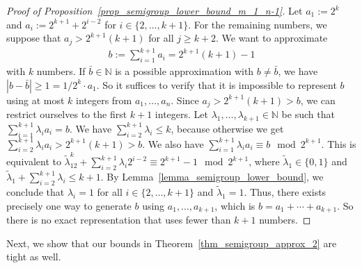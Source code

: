 \documentclass[pdflatex]{sn-jnl}
\newcommand{\N}{\mathbb{N}}
\theoremstyle{thmstyleone}%
\theoremstyle{thmstyletwo}%
\theoremstyle{thmstylethree}%
\begin{document}
	\begin{proof}[Proof of Proposition~\ref{prop_semigroup_lower_bound_m_1_n-1}]
		Let $a_1 := 2^{k}$ and $a_i := 2^{k+1} + 2^{i-2}$ for $i\in\lbrace 2,\ldots,k+1\rbrace$. For the remaining numbers, we suppose that $a_j > 2^{k+1}(k+1)$ for all $j\geq k+2$. We want to approximate 
		\begin{align*}
			b := \sum_{i=1}^{k+1}a_i = 2^{k+1}(k+1) -1
		\end{align*} 
		with $k$ numbers. 
		If $\bar{b}\in \N$ is a possible approximation with $b\neq\bar{b}$, we have $\left| b - \bar{b}\right| \geq 1 = 1/2^{k}\cdot a_1$. So it suffices to verify that it is impossible to represent $b$ using at most $k$ integers from $a_1,\ldots,a_n$. Since $a_j > 2^{k+1}(k+1) > b$, we can restrict ourselves to the first $k+1$ integers. 
		Let $\lambda_1,\ldots,\lambda_{k+1}\in \N$ be such that $\sum_{i=1}^{k+1}\lambda_i a_i = b$. We have $\sum_{i=2}^{k+1}\lambda_i \leq k$, because otherwise we get $\sum_{i=2}^{k+1}\lambda_i a_i > 2^{k+1}(k+1) > b$. We also have $\sum_{i=1}^{k+1}\lambda_i a_i \equiv b \mod 2^{k+1}$. This is equivalent to $\tilde{\lambda}_12^{k} + \sum_{i=2}^{k+1}\lambda_i 2^{i-2} \equiv 2^{k+1} - 1 \mod 2^{k+1}$, where $\tilde{\lambda}_1\in\lbrace 0,1\rbrace$ and $\tilde{\lambda}_1 + \sum_{i=2}^{k+1}\lambda_i\leq {k+1}$. By Lemma~\ref{lemma_semigroup_lower_bound}, we conclude that $\lambda_i = 1$ for all $i\in\lbrace 2,\ldots,k+1\rbrace$ and $\tilde{\lambda}_1 = 1$. Thus, there exists precisely one way to generate $b$ using $a_1,\ldots, a_{k+1}$, which is $b=a_1+\cdots+a_{k+1}$. So there is no exact representation that uses fewer than $k+1$ numbers.
	\end{proof}
	Next, we show that our bounds in Theorem~\ref{thm_semigroup_approx_2} are tight as well.
\end{document}
